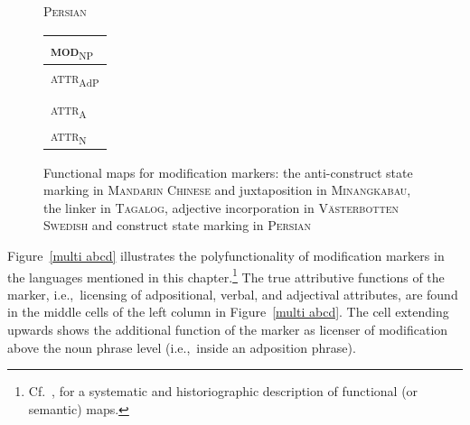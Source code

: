 \begin{figure}
{\begin{center}
\end{center}
}
\parbox[b]{0.20\textwidth}{
\begin{center}\textsc{Persian}\\
\bigskip
\begin{tabular}{| l |}
\hline
\textsc{mod}$_{\text{NP}}$\\
\hline
\hline
\textsc{attr}$_{\text{AdP}}$\\
\hline
\\
\hline
\textsc{attr}$_{\text{A}}$\\
\hline
\textsc{attr}$_{\text{N}}$\\
\hline
\end{tabular}
\end{center}
}
\caption[Functional map for modification marking]{Functional maps for modification markers: the anti\hyp{}construct state marking in \textsc{Mandarin Chinese} and juxtaposition in \textsc{Minangkabau}, the linker in \textsc{Tagalog}, adjective incorporation in \textsc{Västerbotten Swedish} and construct state marking in \textsc{Persian}
}
\end{figure}
Figure~\ref{multi abcd} illustrates the polyfunctionality of modification markers in the languages mentioned in this chapter.\footnote{Cf.~\cite{haspelmath2003}, for a systematic and historiographic description of functional (or semantic) maps.} The true attributive functions of the marker, i.e.,~licensing of adpositional, verbal, and adjectival attributes, are found in the middle cells of the left column in Figure~\ref{multi abcd}. The cell extending upwards shows the additional function of the marker as licenser of modification above the noun phrase level (i.e.,~inside an adposition phrase).%

